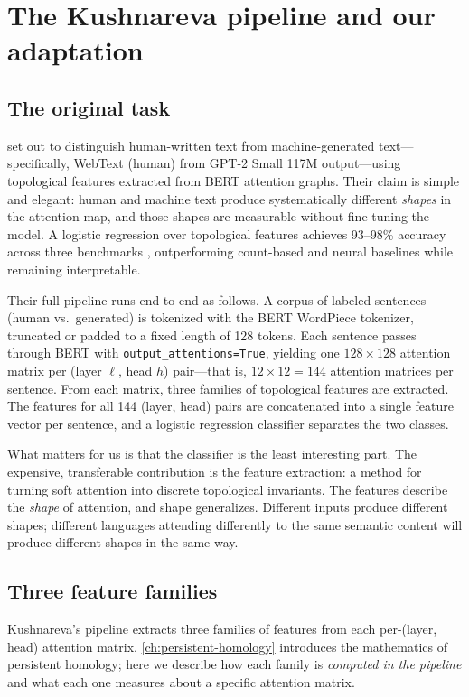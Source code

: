 \chapter{The Kushnareva pipeline and our adaptation}
\label{ch:pipeline}

\section{The original task}

\textcite{kushnareva2021} set out to distinguish human-written text from machine-generated text---specifically, WebText (human) from GPT-2 Small 117M output---using topological features extracted from BERT attention graphs. Their claim is simple and elegant: human and machine text produce systematically different \emph{shapes} in the attention map, and those shapes are measurable without fine-tuning the model. A logistic regression over topological features achieves 93--98\% accuracy across three benchmarks \parencite{kushnareva2021}, outperforming count-based and neural baselines while remaining interpretable.

Their full pipeline runs end-to-end as follows. A corpus of labeled sentences (human vs.\ generated) is tokenized with the BERT WordPiece tokenizer, truncated or padded to a fixed length of 128 tokens. Each sentence passes through BERT with \texttt{output\_attentions=True}, yielding one $128 \times 128$ attention matrix per (layer $\ell$, head $h$) pair---that is, $12 \times 12 = 144$ attention matrices per sentence. From each matrix, three families of topological features are extracted. The features for all 144 (layer, head) pairs are concatenated into a single feature vector per sentence, and a logistic regression classifier separates the two classes.

What matters for us is that the classifier is the least interesting part. The expensive, transferable contribution is the feature extraction: a method for turning soft attention into discrete topological invariants. The features describe the \emph{shape} of attention, and shape generalizes. Different inputs produce different shapes; different languages attending differently to the same semantic content will produce different shapes in the same way.

\section{Three feature families}

Kushnareva's pipeline extracts three families of features from each per-(layer, head) attention matrix. \autoref{ch:persistent-homology} introduces the mathematics of persistent homology; here we describe how each family is \emph{computed in the pipeline} and what each one measures about a specific attention matrix.

